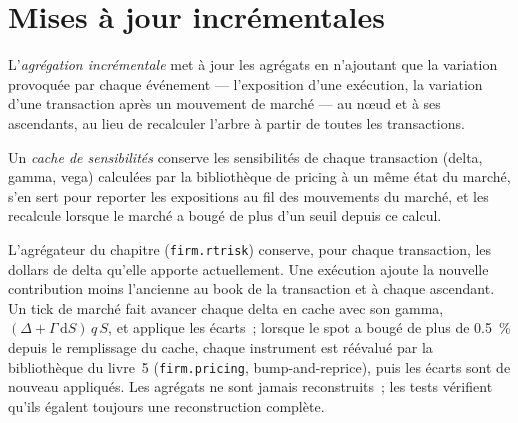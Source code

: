 \section{Mises à jour incrémentales}

\begin{definition}\label{def:pl:real-time-risk:incremental}
L'\emph{agrégation incrémentale} met à jour les agrégats en n'ajoutant que la variation provoquée par chaque événement --- l'exposition d'une exécution,
la variation d'une transaction après un mouvement de marché --- au nœud et à ses ascendants, au lieu de recalculer l'arbre à partir de toutes les transactions.
\end{definition}

\begin{definition}\label{def:pl:real-time-risk:cache}
Un \emph{cache de sensibilités} conserve les sensibilités de chaque transaction (delta, gamma, vega) calculées par la bibliothèque de pricing à
un même état du marché, s'en sert pour reporter les expositions au fil des mouvements du marché, et les recalcule lorsque le marché a bougé de plus d'un
seuil depuis ce calcul.
\end{definition}

L'agrégateur du chapitre (\texttt{firm.rtrisk}) conserve, pour chaque transaction, les dollars de delta qu'elle apporte actuellement. Une exécution ajoute la nouvelle
contribution moins l'ancienne au book de la transaction et à chaque ascendant. Un tick de marché fait avancer chaque delta en cache avec son gamma, $(\Delta +
\Gamma\,\mathrm{d}S)\,q\,S$, et applique les écarts~; lorsque le spot a bougé de plus de 0.5~\% depuis le remplissage du cache, chaque
instrument est réévalué par la bibliothèque du livre~5 (\texttt{firm.pricing}, bump-and-reprice), puis les écarts sont de nouveau appliqués. Les agrégats ne
sont jamais reconstruits~; les tests vérifient qu'ils égalent toujours une reconstruction complète.

\label{lst:pl:real-time-risk:cache}

\label{lst:pl:real-time-risk:aggregator}

